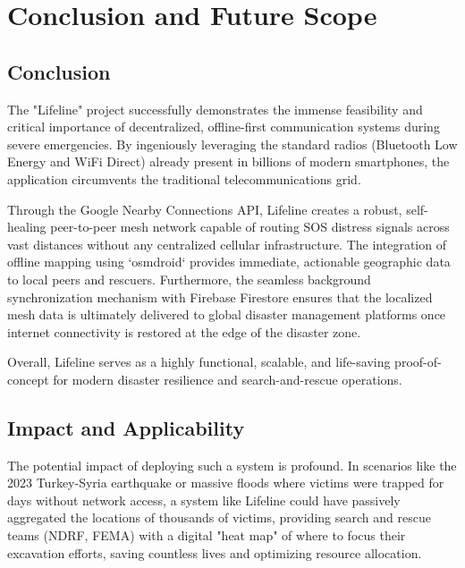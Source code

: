 
\chapter{Conclusion and Future Scope} 

\label{Chapter5}

\section{Conclusion}
The "Lifeline" project successfully demonstrates the immense feasibility and critical importance of decentralized, offline-first communication systems during severe emergencies. By ingeniously leveraging the standard radios (Bluetooth Low Energy and WiFi Direct) already present in billions of modern smartphones, the application circumvents the traditional telecommunications grid. 

Through the Google Nearby Connections API, Lifeline creates a robust, self-healing peer-to-peer mesh network capable of routing SOS distress signals across vast distances without any centralized cellular infrastructure. The integration of offline mapping using `osmdroid` provides immediate, actionable geographic data to local peers and rescuers. Furthermore, the seamless background synchronization mechanism with Firebase Firestore ensures that the localized mesh data is ultimately delivered to global disaster management platforms once internet connectivity is restored at the edge of the disaster zone. 

Overall, Lifeline serves as a highly functional, scalable, and life-saving proof-of-concept for modern disaster resilience and search-and-rescue operations.

\section{Impact and Applicability}
The potential impact of deploying such a system is profound. In scenarios like the 2023 Turkey-Syria earthquake or massive floods where victims were trapped for days without network access, a system like Lifeline could have passively aggregated the locations of thousands of victims, providing search and rescue teams (NDRF, FEMA) with a digital "heat map" of where to focus their excavation efforts, saving countless lives and optimizing resource allocation.

